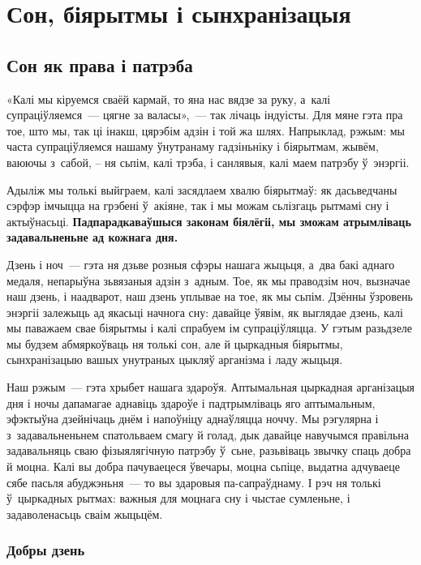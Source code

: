 \chapter{Сон, біярытмы і сынхранізацыя}

\section{Сон як права і патрэба}

«Калі мы кіруемся сваёй кармай, то яна нас вядзе за руку, а~калі супраціўляемся~--- цягне за валасы»,~--- так лічаць індуісты. Для мяне гэта пра тое, што мы, так ці інакш, цярэбім адзін і той жа шлях. Напрыклад, рэжым: мы часта супраціўляемся нашаму ўнутранаму гадзіньніку і біярытмам, жывём, ваюючы з~сабой, -- ня сьпім, калі трэба, і санлявыя, калі маем патрэбу ў~энэргіі.

Адыліж мы толькі выйграем, калі засядлаем хвалю біярытмаў: як дасьведчаны сэрфэр імчыцца на грэбені ў~акіяне, так і мы можам сьлізгаць рытмамі сну і актыўнасьці. \textbf{Падпарадкаваўшыся законам біялёгіі, мы зможам атрымліваць задавальненьне ад кожнага дня.}

Дзень і ноч~--- гэта ня дзьве розныя сфэры нашага жыцьця, а~два бакі аднаго медаля, непарыўна зьвязаныя адзін з~адным. Тое, як мы праводзім ноч, вызначае наш дзень, і наадварот, наш дзень уплывае на тое, як мы сьпім. Дзённы ўзровень энэргіі залежыць ад якасьці начнога сну: давайце ўявім, як выглядае дзень, калі мы паважаем свае біярытмы і калі спрабуем ім супраціўляцца. У гэтым разьдзеле мы будзем абмяркоўваць ня толькі сон, але й цыркадныя біярытмы, сынхранізацыю вашых унутраных цыкляў арганізма і ладу жыцьця.

Наш рэжым~--- гэта хрыбет нашага здароўя. Аптымальная цыркадная арганізацыя дня і ночы дапамагае аднавіць здароўе і падтрымліваць яго аптымальным, эфэктыўна дзейнічаць днём і напоўніцу аднаўляцца ноччу. Мы рэгулярна і з~задавальненьнем спатольваем смагу й голад, дык давайце навучымся правільна задавальняць сваю фізыялягічную патрэбу ў~сьне, разьвіваць звычку спаць добра й моцна. Калі вы добра пачуваецеся ўвечары, моцна сьпіце, выдатна адчуваеце сябе пасьля абуджэньня~--- то вы здаровыя па-сапраўднаму. І рэч ня толькі ў~цыркадных рытмах: важныя для моцнага сну і чыстае сумленьне, і задаволенасьць сваім жыцьцём.

\subsection*{Добры дзень}

